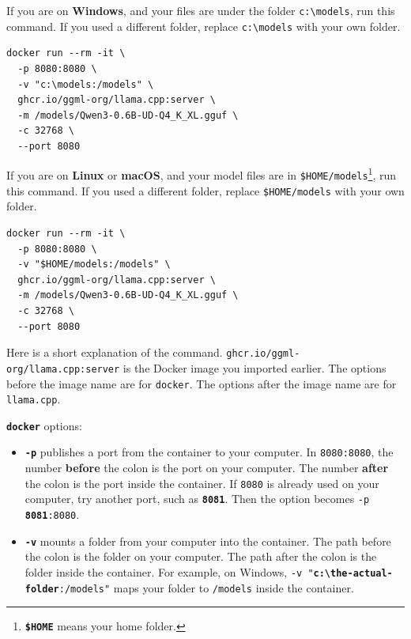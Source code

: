\documentclass[a4paper,12pt]{article}
\begin{document}
If you are on \textbf{Windows}, and your files are under the folder \texttt{c:\textbackslash{}models}, run this command. If you used a different folder, replace \texttt{c:\textbackslash{}models} with your own folder.

\begin{verbatim}
docker run --rm -it \
  -p 8080:8080 \
  -v "c:\models:/models" \
  ghcr.io/ggml-org/llama.cpp:server \
  -m /models/Qwen3-0.6B-UD-Q4_K_XL.gguf \
  -c 32768 \
  --port 8080
\end{verbatim}

If you are on \textbf{Linux} or \textbf{macOS}, and your model files are in \texttt{\$HOME/models}\footnote{\textbf{\texttt{\$HOME}} means your home folder.}, run this command. If you used a different folder, replace \texttt{\$HOME/models} with your own folder.

\begin{verbatim}
docker run --rm -it \
  -p 8080:8080 \
  -v "$HOME/models:/models" \
  ghcr.io/ggml-org/llama.cpp:server \
  -m /models/Qwen3-0.6B-UD-Q4_K_XL.gguf \
  -c 32768 \
  --port 8080
\end{verbatim}

Here is a short explanation of the command. \texttt{ghcr.io/ggml-org/llama.cpp:server} is the Docker image you imported earlier. The options before the image name are for \texttt{docker}. The options after the image name are for \texttt{llama.cpp}.

\textbf{\texttt{docker}} options:

\begin{itemize}
\item \texttt{\textbf{-p}} publishes a port from the container to your computer. In \texttt{8080:8080}, the number \textbf{before} the colon is the port on your computer. The number \textbf{after} the colon is the port inside the container. If \texttt{8080} is already used on your computer, try another port, such as \texttt{\textbf{8081}}. Then the option becomes \texttt{-p \textbf{8081}:8080}.

\item \texttt{\textbf{-v}} mounts a folder from your computer into the container. The path before the colon is the folder on your computer. The path after the colon is the folder inside the container. For example, on Windows, \texttt{-v "\textbf{c:\textbackslash{}the-actual-folder}:/models"} maps your folder to \texttt{/models} inside the container.
\end{itemize}
\end{document}
